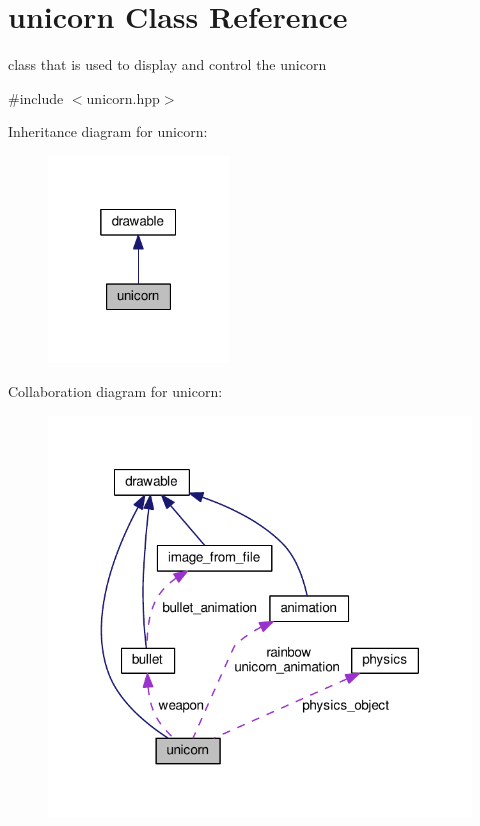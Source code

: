 \hypertarget{classunicorn}{}\section{unicorn Class Reference}
\label{classunicorn}


class that is used to display and control the unicorn  




{\ttfamily \#include $<$unicorn.\+hpp$>$}



Inheritance diagram for unicorn\+:\nopagebreak
\begin{figure}[H]
\begin{center}
\leavevmode
\includegraphics[width=136pt]{classunicorn__inherit__graph}
\end{center}
\end{figure}


Collaboration diagram for unicorn\+:\nopagebreak
\begin{figure}[H]
\begin{center}
\leavevmode
\includegraphics[width=318pt]{classunicorn__coll__graph}
\end{center}
\end{figure}
